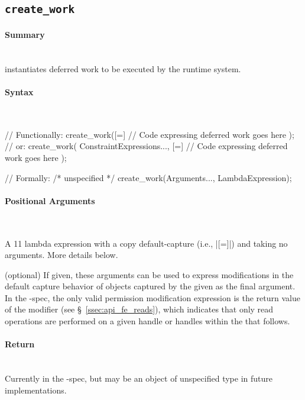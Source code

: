 \subsection{\texttt{create\_work}}
\label{ssec:api_fe_cw}

\paragraph{Summary}\mbox{}\\
 instantiates deferred work to be executed by the \gls{runtime
system}.

\paragraph{Syntax}\mbox{}\\
\begin{CppCode}
// Functionally:
create_work([=]{
  // Code expressing deferred work goes here
});
// or:
create_work(
  ConstraintExpressions..., 
  [=]{
    // Code expressing deferred work goes here
  }
);

// Formally:
/* unspecified */ create_work(Arguments..., LambdaExpression);
\end{CppCode}

\paragraph{Positional Arguments}\mbox{}\\
\begin{compactitem}
  \item {} A \CC{}11 lambda expression with a copy
    default-\gls{capture} (i.e., |[=]|) and taking no arguments.  More details
  below.
\item {} (optional) If given, these
  arguments can be used to express modifications in the default capture behavior
  of  objects captured by the 
  given as the final argument.  In the \specVersion-spec, the only valid permission
  modification expression is the return value of the  modifier
  (see \S~\ref{ssec:api_fe_reads}), which indicates that only read operations
  are performed on a given \gls{handle} or \glspl{handle} within the
   that follows.
\end{compactitem}


\paragraph{Return}\mbox{}\\
Currently  in the \specVersion-spec, but may be an object of unspecified
type in future implementations.

